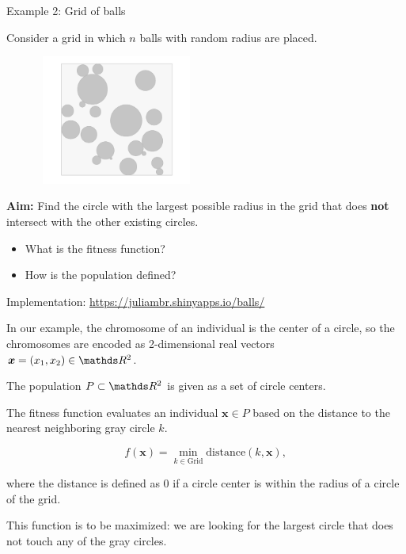 \documentclass[11pt,compress,t,notes=noshow, xcolor=table]{beamer}
\begin{document}
\begin{vbframe}{Example 2: Grid of balls}

Consider a grid in which $n$ balls with random radius are placed.
\begin{center}
\begin{figure}
  \includegraphics[height = 4.25cm, width = 5.25cm]{figure_man/grid.png}
\end{figure}
\end{center}


\textbf{Aim:} Find the circle with the largest possible radius in the grid that does \textbf{not} intersect with the other existing circles.

\begin{itemize}
\item What is the fitness function?
\item How is the population defined?
\end{itemize}

Implementation: \url{https://juliambr.shinyapps.io/balls/}

\framebreak

In our example, the chromosome of an individual is the center of a circle, so the chromosomes are encoded as 2-dimensional real vectors $\bm{x} = (x_1, x_2) \in \R^2$.

\lz

The population $P \subset \R^2$ is given as a set of circle centers.

\lz

The fitness function evaluates an individual $\bm{x} \in P$ based on the distance to the nearest neighboring gray circle $k$.

$$
f(\bm{x}) = \min_{k \in \text{Grid}} \text{distance} (k, \bm{x}),
$$

where the distance is defined as $0$ if a circle center is within the radius of a circle of the grid.

This function is to be maximized: we are looking for the largest circle that does not touch any of the gray circles.

\end{vbframe}



\endlecture
\end{document}
